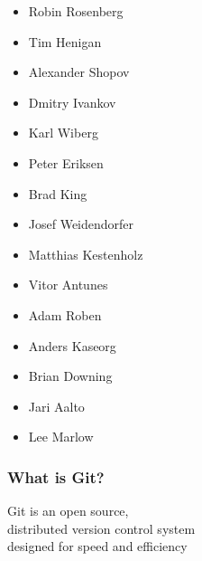 \begin{frame}
{\begin{multicols}{7}
\begin{itemize}
                \item[] Robin Rosenberg
                \item[] Tim Henigan
                \item[] Alexander Shopov
                \item[] Dmitry Ivankov
                \item[] Karl Wiberg
                \item[] Peter Eriksen
                \item[] Brad King
                \item[] Josef Weidendorfer
                \item[] Matthias Kestenholz
                \item[] Vitor Antunes
                \item[] Adam Roben
                \item[] Anders Kaseorg
                \item[] Brian Downing
                \item[] Jari Aalto
                \item[] Lee Marlow
            \end{itemize}
        \end{multicols}
    }
\end{frame}

\begin{frame}
    \frametitle{What is Git?}
    \centering
    Git is an open source,\\
    \alert{distributed} version control system\\
    designed for speed and efficiency
\end{frame}

